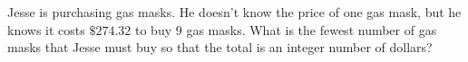 Jesse is purchasing gas masks. He doesn't know the price of one gas mask, but he knows it costs $\$274.32$ to buy $9$ gas masks. What is the fewest number of gas masks that Jesse must buy so that the total is an integer number of dollars?
